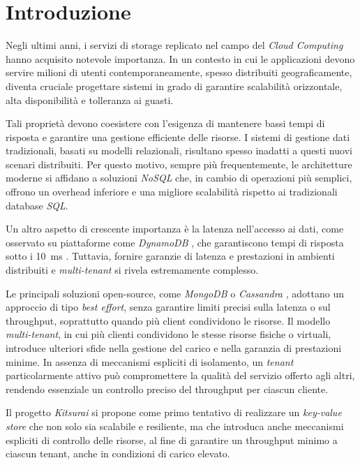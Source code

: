 \section{Introduzione}
\label{sec:introduzione}

Negli ultimi anni, i servizi di storage replicato nel campo del \textit{Cloud Computing} hanno acquisito notevole importanza.
In un contesto in cui le applicazioni devono servire milioni di utenti contemporaneamente, spesso distribuiti geograficamente, diventa cruciale progettare sistemi in grado di garantire scalabilità orizzontale, alta disponibilità e tolleranza ai guasti.

Tali proprietà devono coesistere con l'esigenza di mantenere bassi tempi di risposta e garantire una gestione efficiente delle risorse.
I sistemi di gestione dati tradizionali, basati su modelli relazionali, risultano spesso inadatti a questi nuovi scenari distribuiti.
Per questo motivo, sempre più frequentemente, le architetture moderne si affidano a soluzioni \textit{NoSQL} che, in cambio di operazioni più semplici, offrono un overhead inferiore e una migliore scalabilità rispetto ai tradizionali database \textit{SQL}.

Un altro aspetto di crescente importanza è la latenza nell'accesso ai dati, come osservato su piattaforme come \textit{DynamoDB} \cite{Dynamo2007}, che garantiscono tempi di risposta sotto i 10~ms \cite{DynamoWhitepaper}.
Tuttavia, fornire garanzie di latenza e prestazioni in ambienti distribuiti e \textit{multi-tenant} si rivela estremamente complesso.

Le principali soluzioni open-source, come \textit{MongoDB} \cite{Mongo} o \textit{Cassandra} \cite{Cassandra}, adottano un approccio di tipo \textit{best effort}, senza garantire limiti precisi sulla latenza o sul throughput, soprattutto quando più client condividono le risorse.
Il modello \textit{multi-tenant}, in cui più clienti condividono le stesse risorse fisiche o virtuali, introduce ulteriori sfide nella gestione del carico e nella garanzia di prestazioni minime.
In assenza di meccanismi espliciti di isolamento, un \textit{tenant} particolarmente attivo può compromettere la qualità del servizio offerto agli altri, rendendo essenziale un controllo preciso del throughput per ciascun cliente.

Il progetto \textit{Kitsurai} si propone come primo tentativo di realizzare un \textit{key-value store} che non solo sia scalabile e resiliente, ma che introduca anche meccanismi espliciti di controllo delle risorse, al fine di garantire un throughput minimo a ciascun tenant, anche in condizioni di carico elevato.

